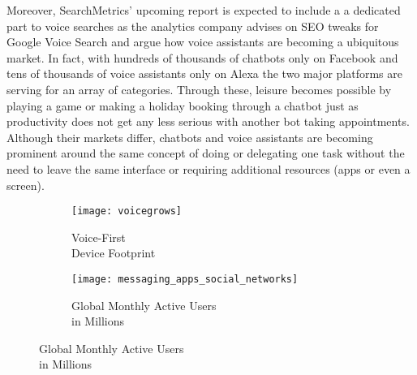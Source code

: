 Moreover, SearchMetrics' upcoming report is expected to include a %
a dedicated part to voice searches as the analytics 
company advises on SEO tweaks for Google Voice Search \cite{searchmetrics:blog} and argue how voice assistants are becoming a ubiquitous market.
In fact, with hundreds of thousands of chatbots only on Facebook and tens of thousands of voice assistants only on Alexa %
the two major platforms are serving for an array of categories. Through these, leisure becomes possible by playing a game \cite{forbes:20bots} or making a holiday booking through a chatbot just as productivity does not get any less serious with another bot taking appointments.
Although their markets differ, chatbots and voice assistants are becoming prominent around the same concept of doing or delegating one task without the need to leave the same interface or requiring additional resources (apps or even a screen).


\begin{figure}[b]
	\centering
\begin{subfigure}[b]{0.3\textwidth}
	\caption{Voice-First \\ Device Footprint \cite{voicelabs}}
	\texttt{[image: voicegrows]} 	
\end{subfigure}
\begin{subfigure}[b]{0.6\textwidth}
\caption[Global Monthly Active Users (Social Media vs. Messaging Apps]{Global Monthly Active Users \\ in Millions \cite{businsider}}
\texttt{[image: messaging\_apps\_social\_networks]}
\end{subfigure}
\end{figure}


%



	
